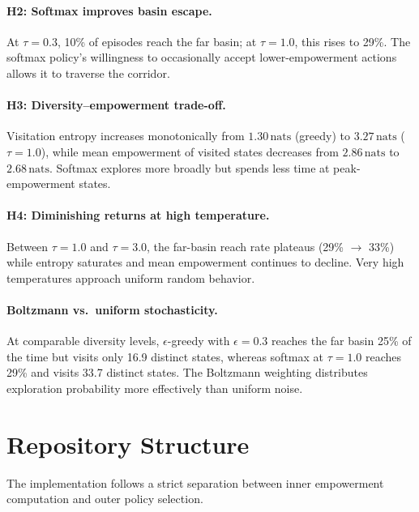 \documentclass[11pt]{article}
\newcommand{\nats}{\,\mathrm{nats}}
\begin{document}
\paragraph{H2: Softmax improves basin escape.}
At $\tau = 0.3$, 10\% of episodes reach the far basin; at
$\tau = 1.0$, this rises to 29\%.  The softmax policy's willingness
to occasionally accept lower-empowerment actions allows it to traverse
the corridor.

\paragraph{H3: Diversity--empowerment trade-off.}
Visitation entropy increases monotonically from $1.30\nats$ (greedy)
to $3.27\nats$ ($\tau = 1.0$), while mean empowerment of visited
states decreases from $2.86\nats$ to $2.68\nats$.  Softmax explores
more broadly but spends less time at peak-empowerment states.

\paragraph{H4: Diminishing returns at high temperature.}
Between $\tau = 1.0$ and $\tau = 3.0$, the far-basin reach rate
plateaus (29\% $\to$ 33\%) while entropy saturates and mean
empowerment continues to decline.  Very high temperatures approach
uniform random behavior.

\paragraph{Boltzmann vs.\ uniform stochasticity.}
At comparable diversity levels, $\epsilon$-greedy with $\epsilon = 0.3$
reaches the far basin 25\% of the time but visits only 16.9 distinct
states, whereas softmax at $\tau = 1.0$ reaches 29\% and visits 33.7
distinct states.  The Boltzmann weighting distributes exploration
probability more effectively than uniform noise.

\section{Repository Structure}
\label{sec:repo}

The implementation follows a strict separation between inner
empowerment computation and outer policy selection.
\end{document}
